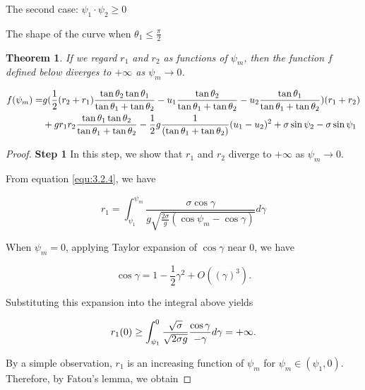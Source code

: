 \documentclass[letterpaper,reqno,10pt,twoside]{amsart}
\newtheorem{theorem}{Theorem}[section]
\theoremstyle{definition}
\theoremstyle{remark}
\begin{document}
\begin{section}{The second case: $\psi_1\cdot \psi_2\geq 0$ }
\begin{subsection}{The shape of the curve when $\theta_1\leq \frac{\pi}{2}$}
        \begin{theorem}

        If we regard $r_1$ and $r_2$ as functions of $\psi_m$, then the function $f$ defined below diverges to $+\infty$ as $\psi_m\rightarrow 0$.

        \begin{align}
             f(\psi_{m})=&g(\frac{1}{2}(r_2+r_1)\frac{\tan\theta_2\tan\theta_1}{\tan\theta_1+\tan\theta_2}-u_1\frac{\tan\theta_2}{\tan\theta_1+\tan\theta_2}-u_2\frac{\tan\theta_1}{\tan\theta_1+\tan\theta_2})(r_1+r_2) \notag \\
              &+gr_1r_2\frac{\tan\theta_1\tan\theta_2}{\tan\theta_1+\tan\theta_2}-\frac{1}{2}g\frac{1}{(\tan\theta_1+\tan\theta_2)}(u_1-u_2)^{2}+\sigma \sin\psi_2-\sigma \sin\psi_1 \label{equ:3.2.9}
        \end{align}
        \end{theorem}

        \begin{proof}

            \textbf{Step 1} In this step, we show that $r_1$ and $r_2$ diverge  to $+\infty$ as $\psi_m\rightarrow 0$.
            
           From equation \eqref{equ:3.2.4}, we have

            \begin{equation*}
                r_1=\int_{\psi_1}^{\psi_m}\frac{\sigma\cos\gamma}{g\sqrt{\frac{2\sigma}{g}(\cos\psi_m-\cos\gamma)}}d\gamma
            \end{equation*}

            \noindent When  $\psi_m=0$, applying Taylor expansion of $\cos\gamma$ near $0$, we have

            \begin{equation*}
                \cos\gamma=1-\frac{1}{2}\gamma^{2}+O((\gamma)^{3}).
            \end{equation*}

           \noindent Substituting this expansion into the integral above yields

            \begin{equation}{\label{equ:3.2.10}}
                r_1(0)\geq \int_{\psi_1}^{0} \frac{\sqrt{\sigma}}{\sqrt{2\sigma g}}\frac{\cos\gamma}{-\gamma}d\gamma=+\infty.
            \end{equation}

            \noindent By a simple observation, $r_1$ is an increasing function of $\psi_m$ for $\psi_m\in(\psi_1,0)$. Therefore, by Fatou's lemma, we obtain


\end{proof}
\end{subsection}
\end{section}
\end{document}
